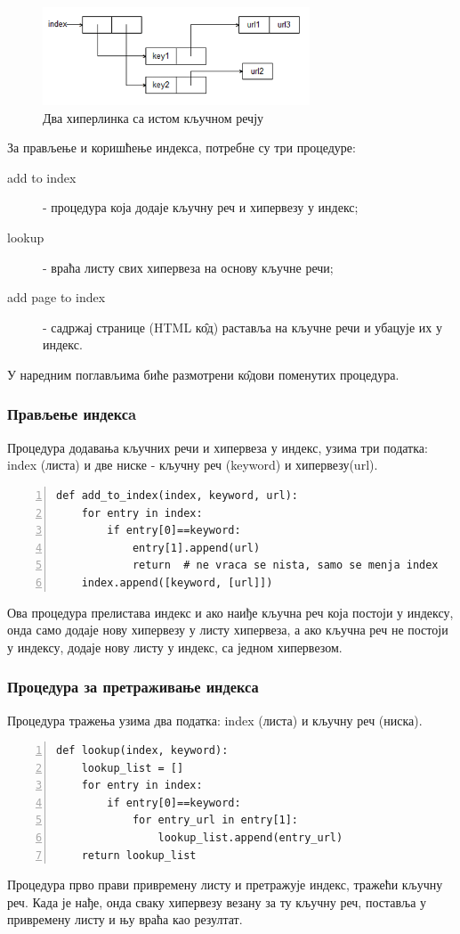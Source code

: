 		\begin{figure}[here]
		\centering
		
		\includegraphics[height=110px, width=300px]{index3.png}
		\caption{Два хиперлинка са истом кључном речју}
		\label{slike:index3}
		\end{figure}	  
	    За прављење и коришћење индекса, потребне су три процедуре:
	    \begin{description}
	    \item[add to index] - процедура која додаје кључну реч и хипервезу у индекс;
	    \item[lookup] - враћа листу свих хипервеза на основу кључне речи;
	    \item[add page to index] - садржај странице (HTML к\^{о}д) раставља на кључне речи и убацује их у индекс.
	    \end{description}
	    У наредним поглављима биће размотрени к\^{о}дови поменутих процедура.
		\subsubsection{Прављење индексa}
		Процедура додавања кључних речи и хипервеза у индекс, узима три податка: index (листа) и две ниске - кључну реч (keyword) и хипервезу(url).
		\begin{lstlisting}[caption=Процедура add\_to\_index, label={lst:addtoindex}, numbers=left]
def add_to_index(index, keyword, url):
    for entry in index:
        if entry[0]==keyword:
            entry[1].append(url)
            return  # ne vraca se nista, samo se menja index
    index.append([keyword, [url]])
		\end{lstlisting}
		Ова процедура прелистава индекс и ако наиђе кључна реч која постоји у индексу, онда само додаје нову хипервезу у листу хипервеза, а ако кључна реч не постоји у индексу, додаје нову листу у индекс, са једном хипервезом.
		\subsubsection{Процедура за претраживање индекса}
		Процедура тражења узима два податка: index (листа) и кључну реч (ниска).
		\begin{lstlisting}[caption=Процедура lookup, label={lst:lookup}, numbers=left]
def lookup(index, keyword):
    lookup_list = []
    for entry in index:
        if entry[0]==keyword:
            for entry_url in entry[1]:
                lookup_list.append(entry_url)
    return lookup_list  
		\end{lstlisting}
		Процедура прво прави привремену листу и претражује индекс, тражећи кључну реч. Када је нађе, онда сваку хипервезу везану за ту кључну реч, поставља у привремену листу и њу враћа као резултат.
		\pagebreak
